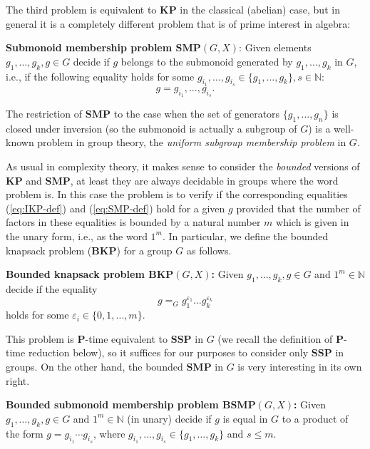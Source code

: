 \documentclass[10pt]{amsart}
\theoremstyle{definition}
\def\P{{\mathbf{P}}}
\def\SSP{{\mathbf{SSP}}}
\def\SMP{{\mathbf{SMP}}}
\def\BSMP{{\mathbf{BSMP}}}
\def\BKP{{\mathbf{BKP}}}
\def\KP{{\mathbf{KP}}}
\begin{document}
The third problem is equivalent to $\KP$ in the classical (abelian) case, but in general it is a completely different problem that is of prime  interest in algebra:

\medskip
\noindent
{\bf Submonoid membership problem $\mathbf{SMP}(G,X)$\index{$\SMP(G,X)$}}:  Given elements $g_1,\ldots,g_k,g\in G$
decide if $g$ belongs to the submonoid generated by $g_1, \ldots, g_k$ in $G$, i.e., if the following equality holds for some $g_{i_1}, \ldots, g_{i_s} \in \{g_1, \ldots, g_k\}, s \in \mathbb{N}$:
\begin{equation}\label{eq:SMP-def}
g = g_{i_1}, \ldots, g_{i_s}.
\end{equation}

\medskip
The restriction of $\SMP$ to the case when the set of generators $\{g_1, \ldots,g_n\}$ is closed under inversion (so the submonoid is actually a subgroup of $G$) is  a well-known problem in group theory, the {\em uniform subgroup membership problem} in $G$.

As usual in complexity theory, it makes sense to consider the {\em bounded} versions of $\KP$ and $\SMP$, at least they are always decidable in groups where the word problem is. In this case the problem is to verify  if the corresponding equalities (\ref{eq:IKP-def}) and  (\ref{eq:SMP-def}) hold for a given $g$ provided that the number of factors in these equalities  is bounded by a natural number $m$ which is given in the unary form, i.e., as the word $1^m$. In particular, we define the bounded knapsack problem ($\BKP$) for a group $G$ as follows.

\medskip \noindent
{\bf Bounded knapsack problem $\BKP(G,X)$\index{$\BKP(G,X)$}:}
Given $g_1,\ldots,g_k,g\in G$ and $1^m\in\mathbb N$ decide if the equality
$$ %
g =_G g_1^{\varepsilon_1} \ldots g_k^{\varepsilon_k}
$$ holds for some $\varepsilon_i \in \{0,1, \ldots, m \}$.

This problem  is  $\P$-time equivalent to  $\SSP$ in $G$ (we recall the definition of $\P$-time reduction below), so it suffices for our purposes to consider only $\SSP$ in groups.
On the other hand,  the bounded $\SMP$ in $G$ is very interesting in its own right.


\medskip \noindent
{\bf Bounded submonoid membership problem $\BSMP(G,X)$\index{$\BSMP(G,X)$}:}
Given $g_1, \ldots , g_k, g \in G$ and $1^m \in \mathbb{N}$ (in unary)
decide if $g$ is equal in $G$ to a product of the form
$g=g_{i_1}\cdots g_{i_s}$, where $g_{i_1}, \ldots, g_{i_s} \in \{g_1, \ldots, g_k\}$ and  $s\le m$.
\end{document}
